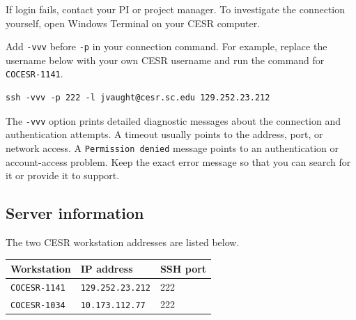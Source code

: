 \documentclass[12pt]{article}
\newcommand{\inlinecode}[1]{\begingroup\setlength{\fboxsep}{2pt}%
  \colorbox{black!5}{\texttt{#1}}\endgroup}
\begin{document}
If login fails, contact your PI or project manager. To investigate the connection yourself, open Windows Terminal on your CESR computer. 

Add \inlinecode{-vvv} before \inlinecode{-p} in your connection command. For example, replace the username below with your own CESR username and run the command for \inlinecode{COCESR-1141}.

\begin{lstlisting}
ssh -vvv -p 222 -l jvaught@cesr.sc.edu 129.252.23.212
\end{lstlisting}

The \inlinecode{-vvv} option prints detailed diagnostic messages about the connection and authentication attempts. A timeout usually points to the address, port, or network access. A \inlinecode{Permission denied} message points to an authentication or account-access problem. Keep the exact error message so that you can search for it or provide it to support.
\subsection*{Server information}

The two CESR workstation addresses are listed below.

\begin{center}
\begin{tabular}{lll}
Workstation & IP address & SSH port\\\hline
\inlinecode{COCESR-1141} & \inlinecode{129.252.23.212} & 222\\
\inlinecode{COCESR-1034} & \inlinecode{10.173.112.77} & 222\\
\end{tabular}
\end{center}
\end{document}
